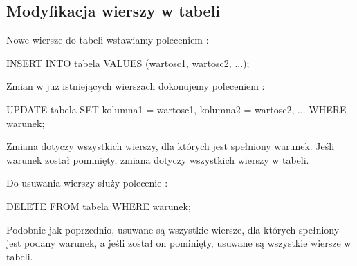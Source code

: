 \subsection{Modyfikacja wierszy w tabeli}

Nowe wiersze do tabeli wstawiamy poleceniem :
\begin{sql}
    INSERT INTO tabela
    VALUES (wartosc1, wartosc2, ...);
\end{sql}

Zmian w już istniejących wierszach dokonujemy poleceniem :
\begin{sql}
    UPDATE tabela
    SET kolumna1 = wartosc1, kolumna2 = wartosc2, ...
    WHERE warunek;
\end{sql}
Zmiana dotyczy wszystkich wierszy, dla których jest spełniony warunek. Jeśli warunek został pominięty, zmiana dotyczy wszystkich wierszy w tabeli.

Do usuwania wierszy służy polecenie :
\begin{sql}
    DELETE FROM tabela
    WHERE warunek;
\end{sql}
Podobnie jak poprzednio, usuwane są wszystkie wiersze, dla których spełniony jest podany warunek, a jeśli został on pominięty, usuwane są wszystkie wiersze w tabeli.

